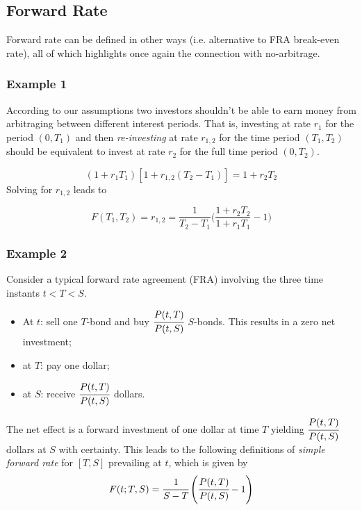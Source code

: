 \documentclass[12pt,a4paper]{article}
\begin{document}
\subsection{Forward Rate}
Forward rate can be defined in other ways (i.e. alternative to FRA break-even rate), all of which highlights once again the connection with no-arbitrage.

\subsubsection{Example 1}
According to our assumptions two investors shouldn't be able to earn money from arbitraging between different interest periods. 
That is, investing at rate $r_1$ for the period $(0, T_1)$ and then \emph{re-investing} at rate $r_{1,2}$ for the time period $(T_1, T_2)$ should be equivalent to invest at rate $r_2$ for the full time period $(0, T_2)$. 

\begin{equation}
	(1+r_1 T_1)[1+r_{1,2}(T_2 - T_1)] = 1 + r_2 T_2
	\label{eq:no_arbitrage_r}
\end{equation}
Solving for $r_{1,2}$ leads to

\begin{equation}
	F(T_1, T_2) = r_{1,2} = \frac{1}{T_2 - T_1}\Big(\frac{1+r_2 T_2}{1+r_1 T_1} - 1 \Big)
\end{equation}

\subsubsection{Example 2}
Consider a typical forward rate agreement (FRA) involving the three time instants $t < T < S$.
\begin{itemize}
\item At $t$: sell one $T$-bond and buy $\cfrac{P(t,T)}{P(t,S)}$ $S$-bonds. This results in a zero net investment;
\item at $T$: pay one dollar;
\item at $S$: receive $\cfrac{P(t,T)}{P(t,S)}$ dollars.
\end{itemize}

The net effect is a forward investment of one dollar at time $T$ yielding $\cfrac{P(t,T)}{P(t,S)}$ dollars at $S$ with certainty.
This leads to the following definitions of \emph{simple forward rate} for $[T,S]$ prevailing at $t$, which is given by
\begin{equation}
F(t; T,S) = \cfrac{1}{S - T}\left(\cfrac{P(t,T)}{P(t,S)} - 1\right)
\end{equation}
\end{document}
